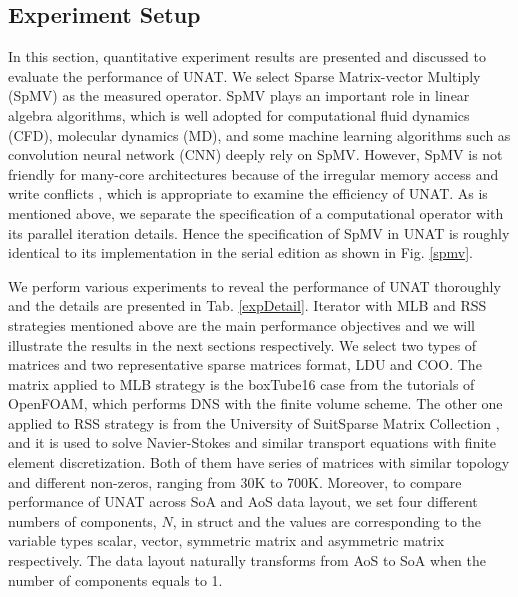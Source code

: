 \documentclass[5p,times]{elsarticle}
\begin{document}
\subsection{Experiment Setup}
In this section, quantitative experiment results are presented and discussed to evaluate the performance of UNAT. We select Sparse Matrix-vector Multiply (SpMV) as the measured operator. SpMV plays an important role in linear algebra algorithms, which is well adopted for computational fluid dynamics (CFD), molecular dynamics (MD), and some machine learning algorithms such as convolution neural network (CNN) deeply rely on SpMV. However, SpMV is not friendly for many-core architectures because of the irregular memory access and write conflicts \cite{b8}, which is appropriate to examine the efficiency of UNAT. As is mentioned above, we separate the specification of a computational operator with its parallel iteration details. Hence the specification of SpMV in UNAT is roughly identical to its implementation in the serial edition as shown in Fig. \ref{spmv}.

We perform various experiments to reveal the performance of UNAT thoroughly and the details are presented in Tab. \ref{expDetail}. Iterator with MLB and RSS strategies mentioned above are the main performance objectives and we will illustrate the results in the next sections respectively. We select two types of matrices and two representative sparse matrices format, LDU and COO. The matrix applied to MLB strategy is the boxTube16 case from the tutorials of OpenFOAM, which performs DNS with the finite volume scheme. The other one applied to RSS strategy is from the University of SuitSparse Matrix Collection \cite{b9}, and it is used to solve Navier-Stokes and similar transport equations with finite element discretization. Both of them have series of matrices with similar topology and different non-zeros, ranging from 30K to 700K. Moreover, to compare performance of UNAT across SoA and AoS data layout, we set four different numbers of components, $N$, in struct and the values are corresponding to the variable types scalar, vector, symmetric matrix and asymmetric matrix respectively. The data layout naturally transforms from AoS to SoA when the number of components equals to 1.
\end{document}
